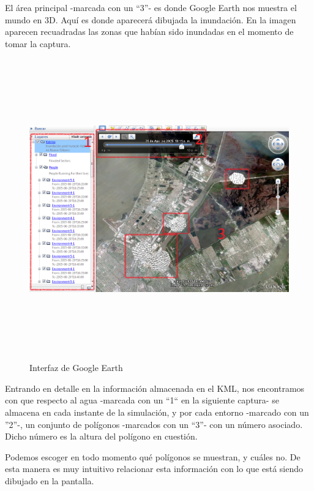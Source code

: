 El área principal -marcada con un ``3''- es donde Google Earth nos muestra el
mundo en 3D. Aquí es donde aparecerá dibujada la inundación. En la imagen
aparecen recuadradas las zonas que habían sido inundadas en el momento de tomar
la captura.

\begin{figure}[H]
 \centering
 \includegraphics[height=130mm,angle=90]{figuras/cap6/resultados/interfaz.png}
 \caption{Interfaz de Google Earth}
\end{figure}

Entrando en detalle en la información almacenada en el KML, nos encontramos con
que respecto al agua -marcada con un ``1`` en la siguiente captura- se almacena
en cada instante de la simulación, y por cada entorno -marcado con un ''2''-, un
conjunto de polígonos -marcados con un ``3''- con un número asociado. Dicho
número es la altura del polígono en cuestión.

Podemos escoger en todo momento qué polígonos se muestran, y cuáles no. De esta
manera es muy intuitivo relacionar esta información con lo que está siendo
dibujado en la pantalla.

